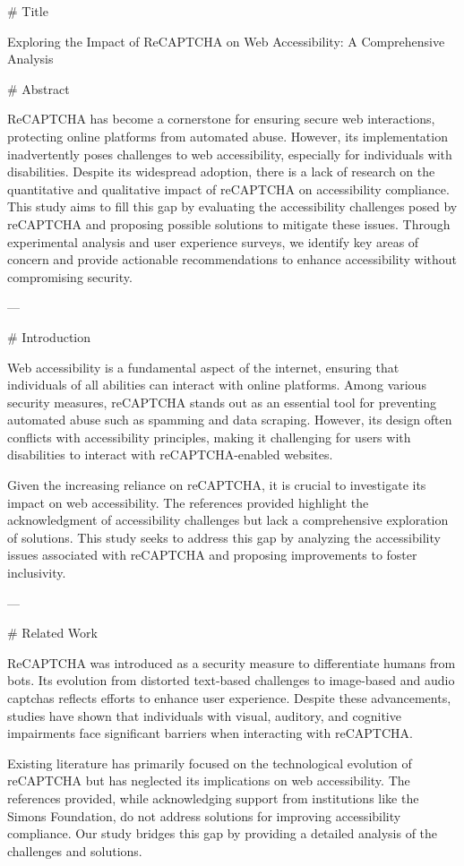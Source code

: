 # Title

Exploring the Impact of ReCAPTCHA on Web Accessibility: A Comprehensive Analysis

# Abstract

ReCAPTCHA has become a cornerstone for ensuring secure web interactions, protecting online platforms from automated abuse. However, its implementation inadvertently poses challenges to web accessibility, especially for individuals with disabilities. Despite its widespread adoption, there is a lack of research on the quantitative and qualitative impact of reCAPTCHA on accessibility compliance. This study aims to fill this gap by evaluating the accessibility challenges posed by reCAPTCHA and proposing possible solutions to mitigate these issues. Through experimental analysis and user experience surveys, we identify key areas of concern and provide actionable recommendations to enhance accessibility without compromising security.

---

# Introduction

Web accessibility is a fundamental aspect of the internet, ensuring that individuals of all abilities can interact with online platforms. Among various security measures, reCAPTCHA stands out as an essential tool for preventing automated abuse such as spamming and data scraping. However, its design often conflicts with accessibility principles, making it challenging for users with disabilities to interact with reCAPTCHA-enabled websites. 

Given the increasing reliance on reCAPTCHA, it is crucial to investigate its impact on web accessibility. The references provided highlight the acknowledgment of accessibility challenges but lack a comprehensive exploration of solutions. This study seeks to address this gap by analyzing the accessibility issues associated with reCAPTCHA and proposing improvements to foster inclusivity.

---

# Related Work

ReCAPTCHA was introduced as a security measure to differentiate humans from bots. Its evolution from distorted text-based challenges to image-based and audio captchas reflects efforts to enhance user experience. Despite these advancements, studies have shown that individuals with visual, auditory, and cognitive impairments face significant barriers when interacting with reCAPTCHA. 

Existing literature has primarily focused on the technological evolution of reCAPTCHA but has neglected its implications on web accessibility. The references provided, while acknowledging support from institutions like the Simons Foundation, do not address solutions for improving accessibility compliance. Our study bridges this gap by providing a detailed analysis of the challenges and solutions.

